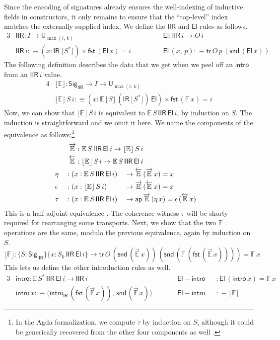 \documentclass[acmsmall,screen,review,anonymous]{acmart}
\newcommand{\msf}[1]{{\mathsf{#1}}}
\newcommand{\mbb}[1]{\mathbb{#1}}
\newcommand{\U}{\msf{U}}
\newcommand{\El}{\msf{El}}
\newcommand{\Sig}{\msf{Sig}}
\newcommand{\IR}{\msf{IR}}
\newcommand{\intro}{\msf{intro}}
\newcommand{\tr}{\msf{tr}}
\newcommand{\fst}{\msf{fst}}
\newcommand{\snd}{\msf{snd}}
\newcommand{\IIR}{\msf{IIR}}
\newcommand{\Sigr}[1]{\lfloor #1 \rfloor}
\newcommand{\floord}[1]{\lfloor #1 \rfloor}
\newcommand{\ora}[1]{\overrightarrow{#1}}
\newcommand{\ola}[1]{\overleftarrow{#1}}
\newcommand{\ap}{\msf{ap}}
\newcommand{\E}{\mbb{E}}
\newcommand{\F}{\mbb{F}}
\begin{document}
Since the encoding of signatures already ensures the well-indexing of inductive fields in
constructors, it only remains to ensure that the ``top-level'' index matches the externally supplied
index. We define the $\IIR$ and $\El$ rules as follows.
\begin{alignat*}{3}
  &\IIR : I \to \U_{\max(i,\,k)}                         && \El : \IIR\,i \to O\,i \\
  &\IIR\,i :\equiv (x : \IR\,\Sigr{S^*}) \times \fst\,(\El\,x) = i \hspace{3em}&& \El\,(x,\,p) :\equiv \tr\,O\,p\,(\snd\,(\El\,x))
\end{alignat*}
The following definition describes the data that we get when we peel off an $\intro$ from an
$\IIR\,i$ value.
\begin{alignat*}{4}
  &\floord{\E} : \Sig_\IIR \to I \to \U_{\max(i,\,k)}\\
  &\floord{\E}\,S\,i :\equiv (x : \E\,\floord{S}\,(\IR\,\floord{S^*})\,\El) \times \fst\,(\F\,x) = i
\end{alignat*}
Now, we can show that $\floord{\E}\,S\,i$ is equivalent to $\E\,S\,\IIR\,\El\,i$, by induction on
$S$. The induction is straightforward and we omit it here. We name the components of the equivalence
as follows:\footnote{In the Agda formalization, we compute $\tau$ by induction on $S$, although it
could be generically recovered from the other four components as well \cite[Section~4.2]{hottbook}.}
\begin{alignat*}{4}
  &\rlap{$\hspace{2em}\ora{\E} : \E\,S\,\IIR\,\El\,i \to \floord{\E}\,S\,i$} \\
  &\rlap{$\hspace{2em}\ola{\E} : \floord{\E}\,S\,i \to \E\,S\,\IIR\,\El\,i$} \\
  &\eta      &&: (x : \E\,S\,\IIR\,\El\,i) &&\to \ola{\E}\,(\ora{\E}\,x) = x \\
  &\epsilon  &&: (x : \floord{\E}\,S\,i)   &&\to \ora{\E}\,(\ola{\E}\,x) = x \\
  &\tau      &&: (x : \E\,S\,\IIR\,\El\,i) &&\to \ap\,\ora{\E}\,(\eta\,x) = \epsilon\,(\ola{\E}\,x)
\end{alignat*}
This is a half adjoint equivalence \cite[Section~4.2]{hottbook}. The coherence witness $\tau$ will
be shorty required for rearranging some transports. Next, we show that the two $\F$ operations are
the same, modulo the previous equivalence, again by induction on $S$.
\[\floord{\F} : \{S : \Sig_\IIR\}\{x : S_0\,\IIR\,\El\,i\} \to \tr\,O\,(\snd\,(\ora{\E}\,x))\,(\snd\,(\F\,(\fst\,(\ora{\E}\,x)))) = \F\,x\]
This lets us define the other introduction rules as well.
\begin{alignat*}{3}
  &\intro    : \E\,S^*\,\IIR\,\El\,i \to \IIR\,i && \msf{El\!\!-\!\!intro} && : \El\,(\intro\,x) = \F\,x \\
  &\intro\,x :\equiv \big(\intro_\IR\,(\fst\,(\ora{\E}\,x)),\,\snd\,(\ora{\E}\,x)\big) \quad\quad&& \msf{El\!\!-\!\!intro} && :\equiv \floord{\F}
\end{alignat*}
\end{document}
